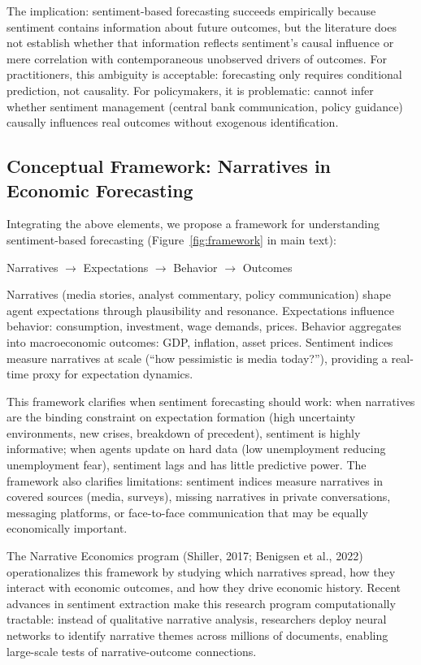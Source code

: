 The implication: sentiment-based forecasting succeeds empirically because sentiment contains information about future outcomes, but the literature does not establish whether that information reflects sentiment's causal influence or mere correlation with contemporaneous unobserved drivers of outcomes. For practitioners, this ambiguity is acceptable: forecasting only requires conditional prediction, not causality. For policymakers, it is problematic: cannot infer whether sentiment management (central bank communication, policy guidance) causally influences real outcomes without exogenous identification.

\subsection{Conceptual Framework: Narratives in Economic Forecasting}

Integrating the above elements, we propose a framework for understanding sentiment-based forecasting (Figure~\ref{fig:framework} in main text):

\noindent
Narratives $\rightarrow$ Expectations $\rightarrow$ Behavior $\rightarrow$ Outcomes

Narratives (media stories, analyst commentary, policy communication) shape agent expectations through plausibility and resonance. Expectations influence behavior: consumption, investment, wage demands, prices. Behavior aggregates into macroeconomic outcomes: GDP, inflation, asset prices. Sentiment indices measure narratives at scale (``how pessimistic is media today?''), providing a real-time proxy for expectation dynamics.

This framework clarifies when sentiment forecasting should work: when narratives are the binding constraint on expectation formation (high uncertainty environments, new crises, breakdown of precedent), sentiment is highly informative; when agents update on hard data (low unemployment reducing unemployment fear), sentiment lags and has little predictive power. The framework also clarifies limitations: sentiment indices measure narratives in covered sources (media, surveys), missing narratives in private conversations, messaging platforms, or face-to-face communication that may be equally economically important.

The Narrative Economics program (Shiller, 2017; Benigsen et al., 2022) operationalizes this framework by studying which narratives spread, how they interact with economic outcomes, and how they drive economic history. Recent advances in sentiment extraction make this research program computationally tractable: instead of qualitative narrative analysis, researchers deploy neural networks to identify narrative themes across millions of documents, enabling large-scale tests of narrative-outcome connections.

